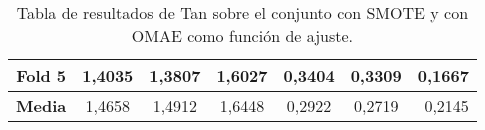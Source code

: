 \begin{table}[H]
{\begin{tabular}{|crrrrrr|}
\multicolumn{1}{|c|}{\textbf{Fold 5}} & \multicolumn{1}{c|}{1,4035}            & \multicolumn{1}{c|}{1,3807}              & \multicolumn{1}{c|}{1,6027}          & \multicolumn{1}{c|}{0,3404}            & \multicolumn{1}{c|}{0,3309}              & 0,1667                             \\ \hline
\multicolumn{1}{|c|}{\textbf{Media}}  & \multicolumn{1}{c|}{1,4658}           & \multicolumn{1}{c|}{1,4912}             & \multicolumn{1}{c|}{1,6448}         & \multicolumn{1}{c|}{0,2922}           & \multicolumn{1}{c|}{0,2719}             & 0,2145                            \\ \hline
\end{tabular}%
}
\caption{Tabla de resultados de Tan sobre el conjunto con SMOTE y con OMAE como función de ajuste.}\label{tablaTANconSMOTEconOMAE}

\end{table}


